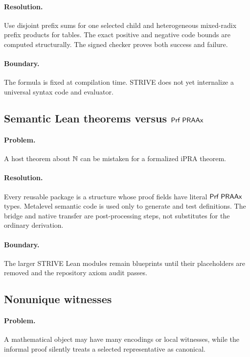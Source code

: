 \paragraph{Resolution.}
Use disjoint prefix sums for one selected child and heterogeneous mixed-radix
prefix products for tables.  The exact positive and negative code bounds are
computed structurally.  The signed checker proves both success and failure.

\paragraph{Boundary.}
The formula is fixed at compilation time.  STRIVE does not yet internalize a
universal syntax code and evaluator.

\subsection{\texorpdfstring{Semantic Lean theorems versus \(\mathsf{Prf}\;\mathsf{PRAAx}\)}{Semantic Lean theorems versus Prf PRAAx}}

\paragraph{Problem.}
A host theorem about \(\mathbb N\) can be mistaken for a formalized iPRA theorem.

\paragraph{Resolution.}
Every reusable package is a structure whose proof fields have literal
\(\mathsf{Prf}\;\mathsf{PRAAx}\) types.  Metalevel semantic code is used only to generate and
test definitions.  The bridge and native transfer are post-processing steps,
not substitutes for the ordinary derivation.

\paragraph{Boundary.}
The larger STRIVE Lean modules remain blueprints until their placeholders are
removed and the repository axiom audit passes.

\subsection{Nonunique witnesses}

\paragraph{Problem.}
A mathematical object may have many encodings or local witnesses, while the
informal proof silently treats a selected representative as canonical.


